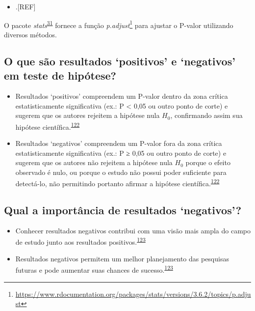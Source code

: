 \documentclass[
  a4paper,
]{book}
\providecommand{\tightlist}{%
  \setlength{\itemsep}{0pt}\setlength{\parskip}{0pt}}
\renewcommand{\href}[2]{#2\footnote{\url{#1}}}
\newenvironment{infobox}[1]
  {
  \begin{itemize}
  \renewcommand{\labelitemi}{
    \raisebox{-.7\height}[0pt][0pt]{
      {\setkeys{Gin}{width=3em,keepaspectratio}
        \texttt{[image: \#1]}}
    }
  }
  \setlength{\fboxsep}{1em}
  \begin{blackbox}
  \item
  }
  {
  \end{blackbox}
  \end{itemize}
  }
\begin{document}
\begin{itemize}
\tightlist
\item
  .{[}REF{]}
\end{itemize}

\begin{infobox}{images/Rlogo}
O pacote \emph{stats}\textsuperscript{\protect\hyperlink{ref-stats-2}{31}} fornece a função \href{https://www.rdocumentation.org/packages/stats/versions/3.6.2/topics/p.adjust}{\emph{p.adjust}} para ajustar o P-valor utilizando diversos métodos.

\end{infobox}

\hypertarget{o-que-suxe3o-resultados-positivos-e-negativos-em-teste-de-hipuxf3tese}{%
\subsection{O que são resultados `positivos' e `negativos' em teste de hipótese?}\label{o-que-suxe3o-resultados-positivos-e-negativos-em-teste-de-hipuxf3tese}}

\begin{itemize}
\item
  Resultados `positivos' compreendem um P-valor dentro da zona crítica estatisticamente significativa (ex.: P \textless{} 0,05 ou outro ponto de corte) e sugerem que os autores rejeitem a hipótese nula \(H_{0}\), confirmando assim sua hipótese científica.\textsuperscript{\protect\hyperlink{ref-greenhalgh1997a}{122}}
\item
  Resultados `negativos' compreendem um P-valor fora da zona crítica estatisticamente significativa (ex.: P ≥ 0,05 ou outro ponto de corte) e sugerem que os autores não rejeitem a hipótese nula \(H_{0}\) porque o efeito observado é nulo, ou porque o estudo não possui poder suficiente para detectá-lo, não permitindo portanto afirmar a hipótese científica.\textsuperscript{\protect\hyperlink{ref-greenhalgh1997a}{122}}
\end{itemize}

\hypertarget{qual-a-importuxe2ncia-de-resultados-negativos}{%
\subsection{Qual a importância de resultados `negativos'?}\label{qual-a-importuxe2ncia-de-resultados-negativos}}

\begin{itemize}
\item
  Conhecer resultados negativos contribui com uma visão mais ampla do campo de estudo junto aos resultados positivos.\textsuperscript{\protect\hyperlink{ref-weintraub2016}{123}}
\item
  Resultados negativos permitem um melhor planejamento das pesquisas futuras e pode aumentar suas chances de sucesso.\textsuperscript{\protect\hyperlink{ref-weintraub2016}{123}}
\end{itemize}
\end{document}
